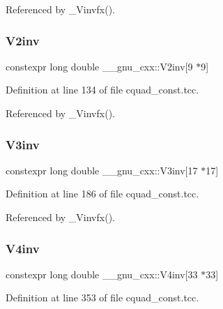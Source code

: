 Referenced by \+\_\+\+Vinvfx().

\mbox{\label{namespace____gnu__cxx_aa4b649154290c645f634d501d63fac0f}} 
\subsubsection{\texorpdfstring{V2inv}{V2inv}}
{\footnotesize\ttfamily constexpr long double \+\_\+\+\_\+gnu\+\_\+cxx\+::\+V2inv\mbox{[}9 $\ast$9\mbox{]}}



Definition at line 134 of file cquad\+\_\+const.\+tcc.



Referenced by \+\_\+\+Vinvfx().

\mbox{\label{namespace____gnu__cxx_ac23b44065db55792c4f65364f34ee956}} 
\subsubsection{\texorpdfstring{V3inv}{V3inv}}
{\footnotesize\ttfamily constexpr long double \+\_\+\+\_\+gnu\+\_\+cxx\+::\+V3inv\mbox{[}17 $\ast$17\mbox{]}}



Definition at line 186 of file cquad\+\_\+const.\+tcc.



Referenced by \+\_\+\+Vinvfx().

\mbox{\label{namespace____gnu__cxx_a19b55e8c50f41d9d0a5618653f960f5c}} 
\subsubsection{\texorpdfstring{V4inv}{V4inv}}
{\footnotesize\ttfamily constexpr long double \+\_\+\+\_\+gnu\+\_\+cxx\+::\+V4inv\mbox{[}33 $\ast$33\mbox{]}}



Definition at line 353 of file cquad\+\_\+const.\+tcc.



